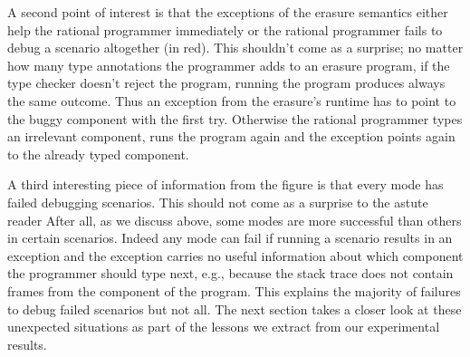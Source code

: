 A second point of interest is that the exceptions of
the erasure semantics either help the rational programmer immediately or 
the rational programmer fails to debug a scenario altogether (in red). This shouldn't
come as a surprise; no matter how many type annotations the programmer
adds to an erasure program, if the type checker doesn't reject the
program, running the program produces always the same outcome. Thus an
exception from the erasure's runtime has to point to the buggy component with
the first try. Otherwise the rational programmer types an irrelevant
component, runs the program again and the exception points again to the
already typed component. 

A third interesting piece of information from
the figure is that every mode has failed debugging scenarios. This should
not come as a surprise to the astute
reader After all, as we
discuss above, some modes are more successful than others in certain
scenarios. Indeed any mode can fail if running a scenario results in an
exception and the exception carries no useful information about which
component the programmer should type next, e.g., because the stack trace 
does not contain frames from the component of the program.
This explains the majority of
failures to debug failed scenarios but not all. The next section takes a
closer look at these unexpected situations as part of the lessons we
extract from our experimental results.
